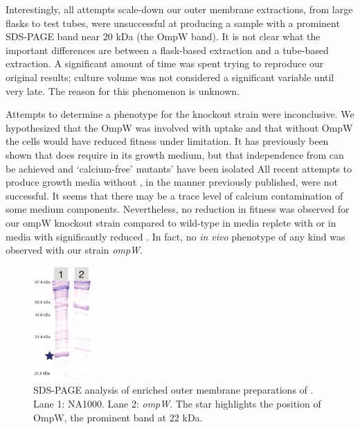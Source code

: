 Interestingly, all attempts scale-down our outer membrane extractions, from large flasks to test tubes, were unsuccessful at producing a sample with a prominent \ac{SDS-PAGE} band near 20 kDa (the OmpW band). It is not clear what the important differences are between a flask-based extraction and a tube-based extraction. A significant amount of time was spent trying to reproduce our original results; culture volume was not considered a significant variable until very late. The reason for this phenomenon is unknown.

Attempts to determine a phenotype for the knockout strain were inconclusive. We hypothesized that the OmpW was involved with  uptake and that without OmpW the cells would have reduced fitness under  limitation. It has previously been shown that \caulobacter does require  in its growth medium, but that independence from  can be achieved and  `calcium-free' mutants' have been isolated All recent attempts to produce growth media without , in the manner previously published, were not successful. It seems that there may be a trace level of calcium contamination of some medium components. Nevertheless, no reduction in fitness was observed for our ompW knockout strain compared to wild-type in media replete with  or in media with significantly reduced . In fact, no \textit{in vivo} phenotype of any kind was observed with our strain \caulobacter \del \textit{ompW}.

\begin{figure}[htb]
  	\begin{center}
   		\includegraphics[width=0.2\textwidth]{porin_chapter/img/Fig-knockout.pdf}
   	\end{center}
   	\caption[\ac{SDS-PAGE} of \caulobacter \del \textit{ompW}]{\ac{SDS-PAGE} analysis of enriched outer membrane preparations of \caulobacter. Lane 1: \caulobacter NA1000. Lane 2: \caulobacter  \del \textit{ompW}. The star highlights the position of OmpW, the prominent band at 22 kDa. 
   	}
   	\label{fig:porinknockout}
\end{figure}   

